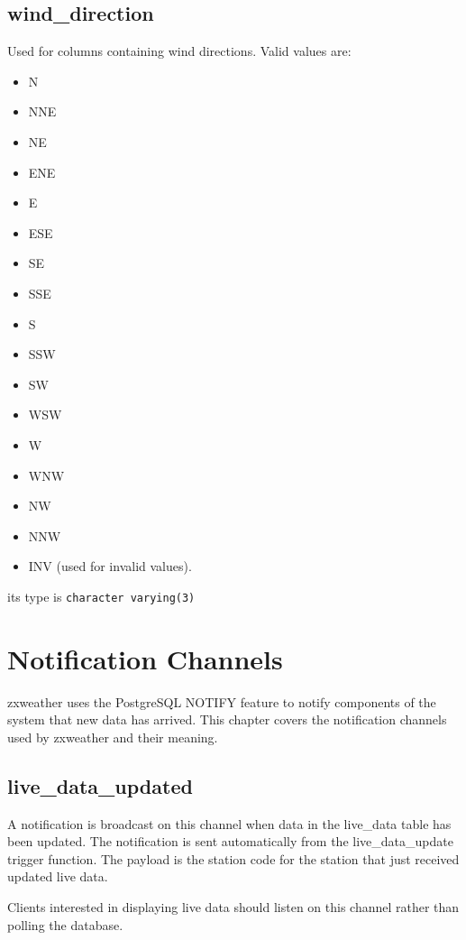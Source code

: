 \documentclass[a4paper,10pt]{book}
\begin{document}
\section{wind\_direction}
\label{wind_direction}

Used for columns containing wind directions. Valid values are:
\begin{itemize}
\item N
\item NNE
\item NE
\item ENE
\item E
\item ESE
\item SE
\item SSE
\item S
\item SSW
\item SW
\item WSW
\item W
\item WNW
\item NW
\item NNW
\item INV (used for invalid values).
\end{itemize}

its type is \verb|character varying(3)|


\chapter{Notification Channels}
\label{cha_notify}

zxweather uses the PostgreSQL NOTIFY feature to notify components of the system that new data has arrived. This chapter covers the notification channels used by zxweather and their meaning.

\section{live\_data\_updated}
A notification is broadcast on this channel when data in the live\_data table has been updated. The notification is sent automatically from the live\_data\_update trigger function. The payload is the station code for the station that just received updated live data.

Clients interested in displaying live data should listen on this channel rather than polling the database.
\end{document}
